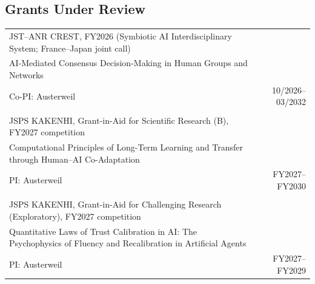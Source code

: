 \documentclass[a4paper,10pt]{article}
\begin{document}
\subsection{Grants Under Review}
\vspace{-4mm}
\begin{longtabu} to \linewidth {Xr}
JST--ANR CREST, FY2026 (Symbiotic AI Interdisciplinary System; France--Japan joint call) & \\
AI-Mediated Consensus Decision-Making in Human Groups and Networks & \\
Co-PI: Austerweil & 10/2026--03/2032 \\ & \\

JSPS KAKENHI, Grant-in-Aid for Scientific Research (B), FY2027 competition & \\
Computational Principles of Long-Term Learning and Transfer through Human--AI Co-Adaptation & \\
PI: Austerweil & FY2027--FY2030 \\ & \\

JSPS KAKENHI, Grant-in-Aid for Challenging Research (Exploratory), FY2027 competition & \\
Quantitative Laws of Trust Calibration in AI: The Psychophysics of Fluency and Recalibration in Artificial Agents & \\
PI: Austerweil & FY2027--FY2029
\end{longtabu}
\end{document}
